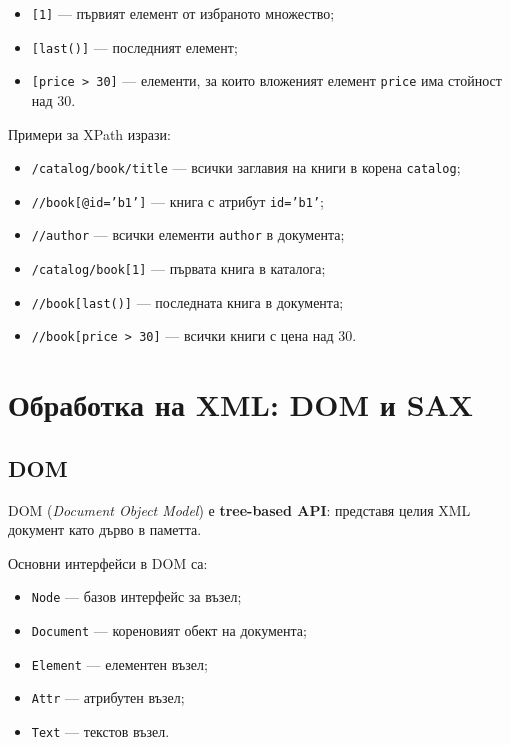 \documentclass{scrartcl}
\begin{document}
\begin{FlushLeft}
\begin{itemize}
    \item \texttt{[1]} --- първият елемент от избраното множество;
    \item \texttt{[last()]} --- последният елемент;
    \item \texttt{[price > 30]} --- елементи, за които вложеният елемент \texttt{price} има стойност над 30.
\end{itemize}

Примери за XPath изрази:

\begin{itemize}
    \item \texttt{/catalog/book/title} --- всички заглавия на книги в корена \texttt{catalog};
    \item \texttt{//book[@id='b1']} --- книга с атрибут \texttt{id='b1'};
    \item \texttt{//author} --- всички елементи \texttt{author} в документа;
    \item \texttt{/catalog/book[1]} --- първата книга в каталога;
    \item \texttt{//book[last()]} --- последната книга в документа;
    \item \texttt{//book[price > 30]} --- всички книги с цена над 30.
\end{itemize}

\section{Обработка на XML: DOM и SAX}

\subsection{DOM}

DOM (\textit{Document Object Model}) е \textbf{tree-based API}: представя целия XML документ като дърво в паметта.

Основни интерфейси в DOM са:

\begin{itemize}
    \item \texttt{Node} --- базов интерфейс за възел;
    \item \texttt{Document} --- кореновият обект на документа;
    \item \texttt{Element} --- елементен възел;
    \item \texttt{Attr} --- атрибутен възел;
    \item \texttt{Text} --- текстов възел.
\end{itemize}


\end{FlushLeft}
\end{document}
